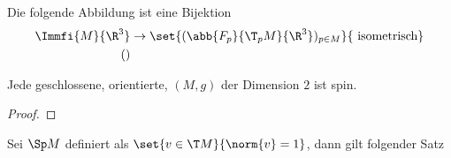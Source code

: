 \begin{Lem}
	Die folgende Abbildung ist eine Bijektion
	\begin{align*}
		\Immfi{M}{\R^3} &\rightarrow \set{ (\abb{F_p}{\T_pM}{\R^3})_{p\in M} }{\text{ isometrisch}}\\
		()
	\end{align*}
\end{Lem}


\begin{Satz}
	Jede geschlossene, orientierte, \RMF  $(M,g)$ der Dimension $2$ ist spin.
	\begin{proof}
	\end{proof}
\end{Satz}

Sei $\Sp M$ definiert als $\set{v \in \T M}{ \norm{v} = 1}$, dann
gilt folgender Satz

